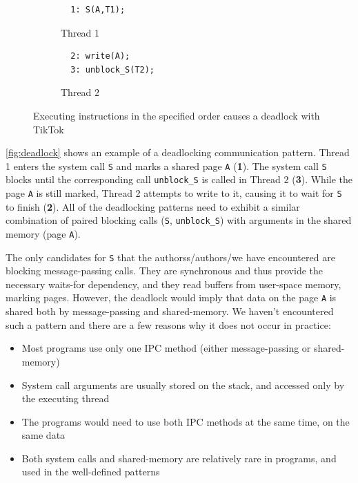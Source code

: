 \documentclass[conference]{IEEEtran}
\newcommand{\sysname}{TikTok}
\begin{document}
\begin{figure}
  \centering
  \begin{subfigure}[b]{0.45\linewidth}
  \begin{minipage}{\linewidth}
  \begin{lstlisting}
  1: S(A,T1);  
  \end{lstlisting}
  \end{minipage}
  \caption{Thread 1}
  \end{subfigure}
  \hfill
  \begin{subfigure}[b]{0.45\linewidth}
  \begin{minipage}{\linewidth}
  \begin{lstlisting}
  2: write(A);
  3: unblock_S(T2);
  \end{lstlisting}  
  \end{minipage}
  \caption{Thread 2}
  \end{subfigure}
  \caption{Executing instructions in the specified order causes a deadlock with \sysname}
  \label{fig:deadlock}
\end{figure}

\autoref{fig:deadlock} shows an example of a deadlocking communication pattern.
Thread 1 enters the system call \texttt{S} and marks a shared page \texttt{A}
(\textbf{1}). The system call \texttt{S} blocks until the corresponding call
\texttt{unblock\_S} is called in Thread 2 (\textbf{3}). While the page
\texttt{A} is still marked, Thread 2 attempts to write to it, causing it to wait
for \texttt{S} to finish (\textbf{2}). All of the deadlocking patterns need to
exhibit a similar combination of paired blocking calls (\texttt{S},
\texttt{unblock\_S}) with arguments in the shared memory (page \texttt{A}).

The only candidates for \texttt{S} that the authors{s/authors/we} have encountered are
blocking message-passing calls. They are synchronous and thus provide the
necessary waits-for dependency, and they read buffers from user-space memory,
marking pages. However, the deadlock would imply that data on the page
\texttt{A} is shared both by message-passing and shared-memory. We haven't
encountered such a pattern and there are a few reasons why it does not occur in
practice:

\begin{itemize}
  \item Most programs use only one IPC method (either message-passing or
  shared-memory)
  \item System call arguments are usually stored on the stack, and accessed only
  by the executing thread
  \item The programs would need to use both IPC methods at the same time, on the
  same data
  \item Both system calls and shared-memory are relatively rare in programs, and
  used in the well-defined patterns
\end{itemize}
\end{document}
